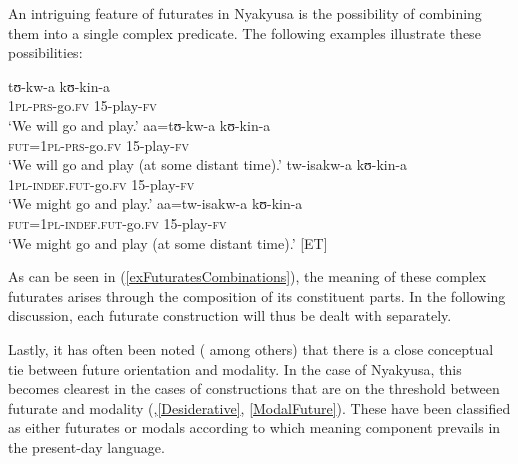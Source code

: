 An intriguing feature of futurates in Nyakyusa is the possibility of combining them into a single complex predicate. The following examples illustrate these possibilities:
\begin{exe}
\ex \label{exFuturatesCombinations}
\begin{xlist}
\ex \gll tʊ-kw-a kʊ-kin-a\\
\textsc{1pl}-\textsc{prs}-go.\textsc{fv} 15-play-\textsc{fv}\\
\glt \lq We will go and play.'
\ex \gll aa=tʊ-kw-a kʊ-kin-a\\
\textsc{fut}=\textsc{1pl}-\textsc{prs}-go.\textsc{fv} 15-play-\textsc{fv}\\
\glt `We will go and play (at some distant time).'
\ex \gll tw-isakw-a kʊ-kin-a\\
\textsc{1pl}-\textsc{indef.fut}-go.\textsc{fv} 15-play-\textsc{fv}\\
\glt `We might go and play.'
\ex  \gll aa=tw-isakw-a kʊ-kin-a\\
\textsc{fut}=\textsc{1pl}-\textsc{indef.fut}-go.\textsc{fv} 15-play-\textsc{fv}\\
\glt `We might go and play (at some distant time).' [ET]
\end{xlist}
\end{exe}
As can be seen in (\ref{exFuturatesCombinations}), the meaning of these complex futurates arises through the composition of its constituent parts. In the following discussion, each futurate construction will thus be dealt with separately.

Lastly, it has often been noted (\citealt[103]{DahlOe1985} among others) that there is a close conceptual tie between future orientation and modality. In the case of Nyakyusa, this becomes clearest in the cases of constructions that are on the threshold between futurate and modality (,\ref{Desiderative}, \ref{ModalFuture}). These have been classified as either futurates or modals according to which meaning component prevails in the present-day language.
